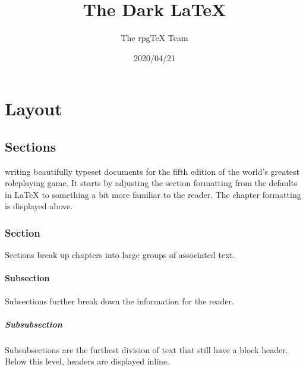 \documentclass[letterpaper,twocolumn,openany,nodeprecatedcode,srd=5.1]{dndbook}
\title{The Dark \LaTeX{}}
\author{The rpgTeX Team}
\date{2020/04/21}
\begin{document}
\frontmatter

\maketitle


\tableofcontents

\mainmatter%

\part{Layout}

\chapter{Sections}

 writing beautifully typeset documents for the fifth edition of the world's greatest roleplaying game. It starts by adjusting the section formatting from the defaults in \LaTeX{} to something a bit more familiar to the reader. The chapter formatting is displayed above.

\section{Section}
Sections break up chapters into large groups of associated text.

\subsection{Subsection}
Subsections further break down the information for the reader.

\subsubsection{Subsubsection}
Subsubsections are the furthest division of text that still have a block header. Below this level, headers are displayed inline.
\end{document}
